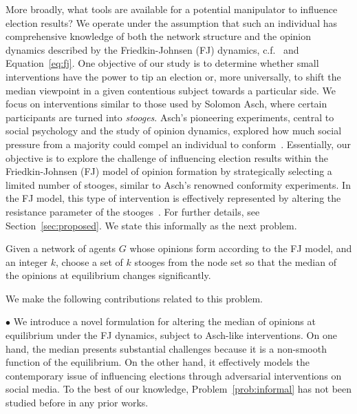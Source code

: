 More broadly, what tools are available for a potential manipulator to influence election results? We operate under the assumption that such an individual has comprehensive knowledge of both the network structure and the opinion dynamics described by the Friedkin-Johnsen (FJ) dynamics, c.f.~\cite{friedkin1997social} and   Equation~\eqref{eq:fj}. One objective of our study is to determine whether small interventions have the power to tip an election or, more universally, to shift the median  viewpoint in a given contentious subject towards a particular side.   We focus on interventions similar to those used by Solomon Asch, where certain participants are turned into {\it stooges}. Asch's pioneering experiments, central to social psychology and the study of opinion dynamics, explored how much social pressure from a majority could compel an individual to conform~\cite{asch1955opinions}. Essentially, our objective is to explore the challenge of influencing election results within the Friedkin-Johnsen (FJ) model of opinion formation by strategically selecting a limited number of stooges, similar to Asch's renowned conformity experiments. In the FJ model, this type of intervention is effectively represented by altering the resistance parameter of the stooges~\cite{abebe2020opinion,ristache2024wiser}. For further details, see Section~\ref{sec:proposed}. We state this informally as the next problem. 


\begin{tcolorbox}
\begin{problem}
\label{prob:informal}
Given a network of agents $G$ whose opinions form according to the FJ model, and an integer $k$, choose a set of $k$ stooges from the node set so that the median of the opinions at equilibrium changes significantly.
\end{problem}
\end{tcolorbox}


\noindent
We make the following contributions
related to this problem.

$\bullet$
We introduce a novel formulation for altering the median of opinions at equilibrium under the FJ dynamics, subject to Asch-like interventions. On one hand, the median presents substantial challenges because it is a non-smooth function of the equilibrium. On the other hand, it effectively models the contemporary issue of influencing elections through adversarial interventions on social media.    
To the best of our knowledge, Problem~\ref{prob:informal}  has not been studied before in any prior works.

